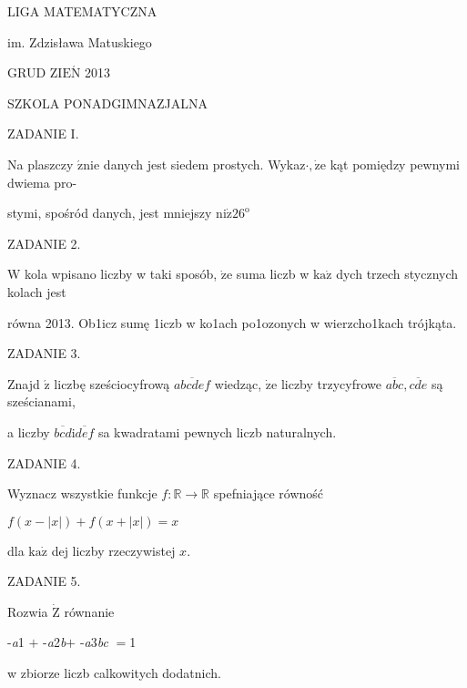 \documentclass[a4paper,12pt]{article}
\begin{document}
LIGA MATEMATYCZNA

im. Zdzisława Matuskiego

GRUD Z$\mathrm{I}\mathrm{E}\acute{\mathrm{N}}$ 2013

SZKOLA PONADGIMNAZJALNA

ZADANIE I.

Na plaszczy $\acute{\mathrm{z}}\mathrm{n}\mathrm{i}\mathrm{e}$ danych jest siedem prostych. Wykaz$\cdot, \dot{\mathrm{z}}\mathrm{e}$ kąt pomiędzy pewnymi dwiema pro-

stymi, spośród danych, jest mniejszy $\mathrm{n}\mathrm{i}\dot{\mathrm{z}}26^{\mathrm{o}}$

ZADANIE 2.

$\mathrm{W}$ kola wpisano liczby w taki sposób, $\dot{\mathrm{z}}\mathrm{e}$ suma liczb w $\mathrm{k}\mathrm{a}\dot{\mathrm{z}}$ dych trzech stycznych kolach jest

równa 2013. Ob1icz sumę 1iczb w ko1ach po1ozonych w wierzcho1kach trójkąta.

ZADANIE 3.

Znajd $\acute{\mathrm{z}}$ liczbę sześciocyfrową $\overline{abcdef}$ wiedząc, $\dot{\mathrm{z}}\mathrm{e}$ liczby trzycyfrowe $\overline{abc}, \overline{cde}$ są sześcianami,

a liczby $\overline{bcd}\mathrm{i}\overline{def}$ sa kwadratami pewnych liczb naturalnych.

ZADANIE 4.

Wyznacz wszystkie funkcje $f:\mathbb{R}\rightarrow \mathbb{R}$ spefniające równość

$f(x-|x|)+f(x+|x|)=x$

dla $\mathrm{k}\mathrm{a}\dot{\mathrm{z}}$ dej liczby rzeczywistej $x.$

ZADANIE 5.

Rozwia $\dot{\mathrm{Z}}$ równanie

-{\it a}1 $+$ -{\it a}2{\it b}$+$ -{\it a}3{\it bc} $=$1

w zbiorze liczb calkowitych dodatnich.
\end{document}
